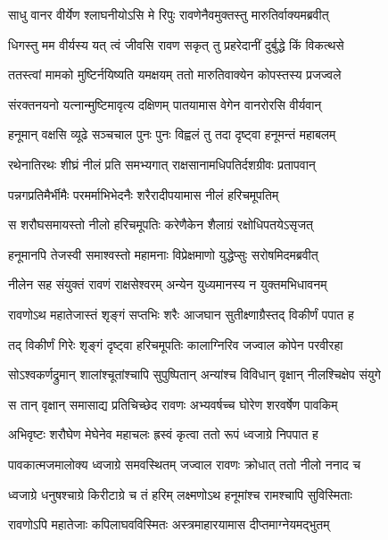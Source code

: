\twolineshloka
{साधु वानर वीर्येण श्लाघनीयोऽसि मे रिपुः}
{रावणेनैवमुक्तस्तु मारुतिर्वाक्यमब्रवीत्} %

\twolineshloka
{धिगस्तु मम वीर्यस्य यत् त्वं जीवसि रावण}
{सकृत् तु प्रहरेदानीं दुर्बुद्धे किं विकत्थसे} %

\twolineshloka
{ततस्त्वां मामको मुष्टिर्नयिष्यति यमक्षयम्}
{ततो मारुतिवाक्येन कोपस्तस्य प्रजज्वले} %

\twolineshloka
{संरक्तनयनो यत्नान्मुष्टिमावृत्य दक्षिणम्}
{पातयामास वेगेन वानरोरसि वीर्यवान्} %

\twolineshloka
{हनूमान् वक्षसि व्यूढे सञ्चचाल पुनः पुनः}
{विह्वलं तु तदा दृष्ट्वा हनूमन्तं महाबलम्} %

\twolineshloka
{रथेनातिरथः शीघ्रं नीलं प्रति समभ्यगात्}
{राक्षसानामधिपतिर्दशग्रीवः प्रतापवान्} %

\twolineshloka
{पन्नगप्रतिमैर्भीमैः परमर्माभिभेदनैः}
{शरैरादीपयामास नीलं हरिचमूपतिम्} %

\twolineshloka
{स शरौघसमायस्तो नीलो हरिचमूपतिः}
{करेणैकेन शैलाग्रं रक्षोधिपतयेऽसृजत्} %

\twolineshloka
{हनूमानपि तेजस्वी समाश्वस्तो महामनाः}
{विप्रेक्षमाणो युद्धेप्सुः सरोषमिदमब्रवीत्} %

\twolineshloka
{नीलेन सह संयुक्तं रावणं राक्षसेश्वरम्}
{अन्येन युध्यमानस्य न युक्तमभिधावनम्} %

\twolineshloka
{रावणोऽथ महातेजास्तं शृङ्गं सप्तभिः शरैः}
{आजघान सुतीक्ष्णाग्रैस्तद् विकीर्णं पपात ह} %

\twolineshloka
{तद् विकीर्णं गिरेः शृङ्गं दृष्ट्वा हरिचमूपतिः}
{कालाग्निरिव जज्वाल कोपेन परवीरहा} %

\twolineshloka
{सोऽश्वकर्णद्रुमान् शालांश्चूतांश्चापि सुपुष्पितान्}
{अन्यांश्च विविधान् वृक्षान् नीलश्चिक्षेप संयुगे} %

\twolineshloka
{स तान् वृक्षान् समासाद्य प्रतिचिच्छेद रावणः}
{अभ्यवर्षच्च घोरेण शरवर्षेण पावकिम्} %

\twolineshloka
{अभिवृष्टः शरौघेण मेघेनेव महाचलः}
{ह्रस्वं कृत्वा ततो रूपं ध्वजाग्रे निपपात ह} %

\twolineshloka
{पावकात्मजमालोक्य ध्वजाग्रे समवस्थितम्}
{जज्वाल रावणः क्रोधात् ततो नीलो ननाद च} %

\twolineshloka
{ध्वजाग्रे धनुषश्चाग्रे किरीटाग्रे च तं हरिम्}
{लक्ष्मणोऽथ हनूमांश्च रामश्चापि सुविस्मिताः} %

\twolineshloka
{रावणोऽपि महातेजाः कपिलाघवविस्मितः}
{अस्त्रमाहारयामास दीप्तमाग्नेयमद्भुतम्} %

